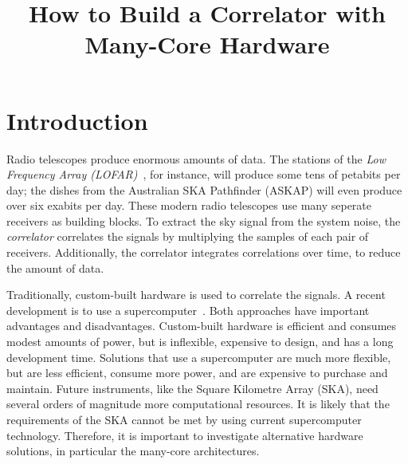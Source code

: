 \documentclass{article}
\title{How to Build a Correlator with Many-Core Hardware}
\begin{document}
\maketitle

\begin{abstract}
\end{abstract}

\section{Introduction}


Radio telescopes produce enormous amounts of data.
The stations of the \emph{Low Frequency Array
(LOFAR)\/}~\cite{Butcher:04,deVos:09}, for instance, will produce some tens of
petabits per day; the dishes from the Australian SKA Pathfinder (ASKAP) will
even produce over six exabits per day.
These modern radio telescopes use many seperate receivers as building blocks.
To extract the sky signal from the system noise, the \emph{correlator\/}
correlates the signals by multiplying the samples of each pair of receivers.
Additionally, the correlator integrates correlations over time, to reduce
the amount of data.

Traditionally, custom-built hardware is used to correlate the signals.
A recent development is to use a supercomputer~\cite{Romein:06,Romein:09b}.
Both approaches have important advantages and disadvantages.
Custom-built hardware is efficient and consumes modest amounts of power, but is
inflexible, expensive to design, and has a long development time.
Solutions that use a supercomputer are much more flexible, but are less
efficient, consume more power, and are expensive to purchase and maintain.
Future instruments, like the Square Kilometre Array (SKA), need several orders
of magnitude more computational resources.
It is likely that the requirements of the SKA cannot be met by using
current supercomputer technology. Therefore, it is important to investigate
alternative hardware solutions, in particular the many-core architectures.
\end{document}
